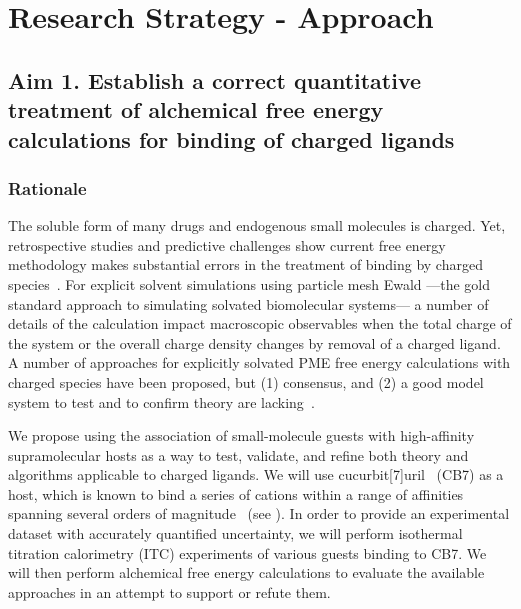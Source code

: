 \documentclass[10pt,final]{article}
\newif\ifinstr
\newcommand{\instr}[1]{\ifdraft{\ifinstr {\color{cyan}\emph{#1}} \fi}{}}
\begin{document}
\section*{Research Strategy - Approach}
\instr{Approach: More specific background information. Describe in detail the experimental design and research methods to be used. Technical hurdles to be overcome should be mentioned. Alternative approaches should be given for experiments that may not be feasible. Discussion of expected or possible results and their interpretation. Best format for each specific aim: a) rationale, b) methods, c) expected results, d) alternatives. Theory aims should follow a similar structure where possible.}


\subsection*{Aim 1. Establish a correct quantitative treatment of alchemical free energy calculations for binding of charged ligands}
\subsubsection*{Rationale}
The soluble form of many drugs and endogenous small molecules is charged. Yet, retrospective studies and predictive challenges show current free energy methodology makes substantial errors in the treatment of binding by charged species~\cite{Rocklin2013b,Muddana2014a}.
%
For explicit solvent simulations using particle mesh Ewald ---the gold standard approach to simulating solvated biomolecular systems--- a number of details of the calculation impact macroscopic observables when the total charge of the system or the overall charge density changes by removal of a charged ligand.
%
A number of approaches for explicitly solvated PME free energy calculations with charged species have been proposed, but (1) consensus, and (2) a good model system to test and to confirm theory are lacking~\cite{Reif2013a, Rocklin2013a, Lin2014a}.

We propose using the association of small-molecule guests with high-affinity supramolecular hosts as a way to test, validate, and refine both theory and algorithms applicable to charged ligands.
%
We will use cucurbit[7]uril~\cite{Lagona2005a} (CB7) as a host, which is known to bind a series of cations within a range of affinities spanning several orders of magnitude~\cite{Cao2013a} (see ).
%
In order to provide an experimental dataset with accurately quantified uncertainty, we will perform isothermal titration calorimetry (ITC) experiments of various guests binding to CB7.
%
We will then perform alchemical free energy calculations to evaluate the available approaches in an attempt to support or refute them.
\end{document}
